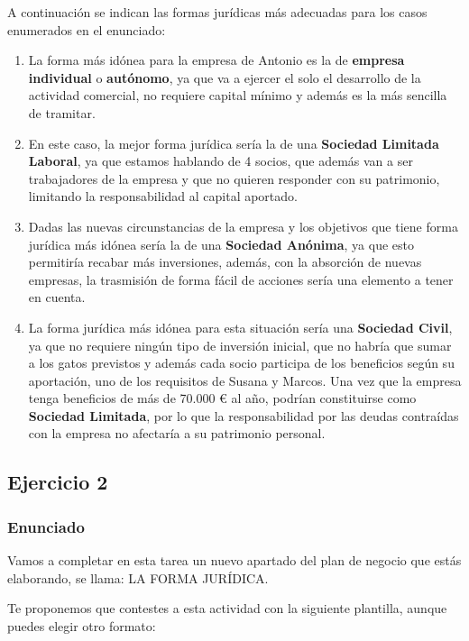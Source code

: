A continuación se indican las formas jurídicas más adecuadas para los casos enumerados en el enunciado:

\begin{enumerate}[label=\alph*)]
    \item La forma más idónea para la empresa de Antonio es la de \textbf{empresa individual} o \textbf{autónomo}, ya que va a ejercer el solo el desarrollo de la actividad comercial, no requiere capital mínimo y además es la más sencilla de tramitar.

    \item En este caso, la mejor forma jurídica sería la de una \textbf{Sociedad Limitada Laboral}, ya que estamos hablando de 4 socios, que además van a ser trabajadores de la empresa y que no quieren responder con su patrimonio, limitando la responsabilidad al capital aportado.

    \item Dadas las nuevas circunstancias de la empresa y los objetivos que tiene forma jurídica más idónea sería la de
    una \textbf{Sociedad Anónima}, ya que esto permitiría recabar más inversiones, además, con la absorción de nuevas empresas, la trasmisión de forma fácil de acciones sería una elemento a tener en cuenta.

    \item La forma jurídica más idónea para esta situación sería una \textbf{Sociedad Civil}, ya que no requiere ningún tipo de inversión inicial, que no habría que sumar a los gatos previstos y además cada socio participa de los beneficios según su aportación, uno de los requisitos de Susana y Marcos. Una vez que la empresa tenga beneficios de más de 70.000 € al año, podrían constituirse como \textbf{Sociedad Limitada}, por lo que la responsabilidad por las deudas contraídas con la empresa no afectaría a su patrimonio personal.
\end{enumerate}

\subsection{Ejercicio 2}

\subsubsection{Enunciado}
Vamos a completar en esta tarea un nuevo apartado del plan de negocio que estás elaborando, se llama: LA FORMA JURÍDICA.

Te proponemos que contestes a esta actividad con la siguiente plantilla, aunque puedes elegir otro formato:

